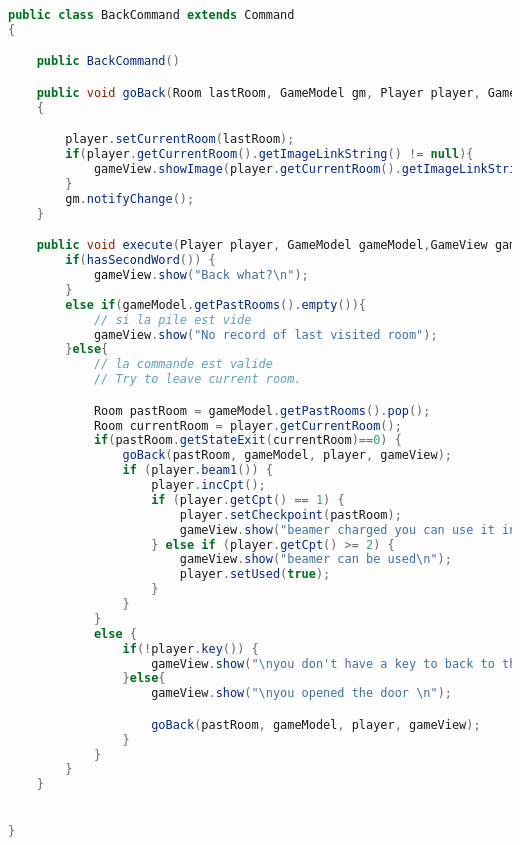 \documentclass[a4paper , 10pt]{article}
\begin{document}
\begin{lstlisting}[language=Java, caption={Backcommand}]
public class BackCommand extends Command
{

    public BackCommand()

    public void goBack(Room lastRoom, GameModel gm, Player player, GameView gameView)
    {

        player.setCurrentRoom(lastRoom);
        if(player.getCurrentRoom().getImageLinkString() != null){
            gameView.showImage(player.getCurrentRoom().getImageLinkString());
        }
        gm.notifyChange();
    }

    public void execute(Player player, GameModel gameModel,GameView gameView){
        if(hasSecondWord()) {
            gameView.show("Back what?\n");
        }
        else if(gameModel.getPastRooms().empty()){
            // si la pile est vide
            gameView.show("No record of last visited room");
        }else{
            // la commande est valide
            // Try to leave current room.

            Room pastRoom = gameModel.getPastRooms().pop();
            Room currentRoom = player.getCurrentRoom();
            if(pastRoom.getStateExit(currentRoom)==0) {
                goBack(pastRoom, gameModel, player, gameView);
                if (player.beam1()) {
                    player.incCpt();
                    if (player.getCpt() == 1) {
                        player.setCheckpoint(pastRoom);
                        gameView.show("beamer charged you can use it in the next room");
                    } else if (player.getCpt() >= 2) {
                        gameView.show("beamer can be used\n");
                        player.setUsed(true);
                    }
                }
            }
            else {
                if(!player.key()) {
                    gameView.show("\nyou don't have a key to back to this room use look to find a key \n");
                }else{
                    gameView.show("\nyou opened the door \n");

                    goBack(pastRoom, gameModel, player, gameView);
                }
            }
        }
    }

    
}

\end{lstlisting}
\end{document}
